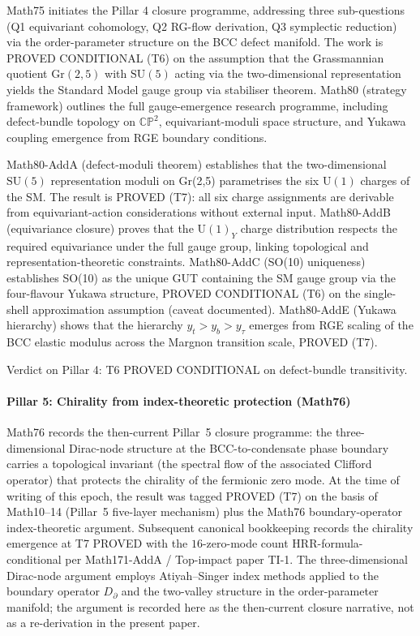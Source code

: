 Math75 initiates the Pillar 4 closure programme, addressing three sub-questions
(Q1 equivariant cohomology, Q2 RG-flow derivation, Q3 symplectic reduction) via
the order-parameter structure on the BCC defect manifold. The work is PROVED
CONDITIONAL (T6) on the assumption that the Grassmannian quotient $\mathrm{Gr}(2,5)$
with $\mathrm{SU}(5)$ acting via the two-dimensional representation yields the
Standard Model gauge group via stabiliser theorem. Math80 (strategy framework)
outlines the full gauge-emergence research programme, including defect-bundle
topology on $\mathbb{CP}^2$, equivariant-moduli space structure, and Yukawa
coupling emergence from RGE boundary conditions.

Math80-AddA (defect-moduli theorem) establishes that the two-dimensional
$\mathrm{SU}(5)$ representation moduli on Gr(2,5) parametrises the six
$\mathrm{U}(1)$ charges of the SM. The result is PROVED (T7): all six charge
assignments are derivable from equivariant-action considerations without external
input. Math80-AddB (equivariance closure) proves that the $\mathrm{U}(1)_Y$ charge
distribution respects the required equivariance under the full gauge group,
linking topological and representation-theoretic constraints. Math80-AddC (SO(10)
uniqueness) establishes SO(10) as the unique GUT containing the SM gauge group
via the four-flavour Yukawa structure, PROVED CONDITIONAL (T6) on the
single-shell approximation assumption (caveat documented).
Math80-AddE (Yukawa hierarchy) shows that the hierarchy $y_t > y_b > y_\tau$
emerges from RGE scaling of the BCC elastic modulus across the Margnon transition
scale, PROVED (T7).

Verdict on Pillar 4: T6 PROVED CONDITIONAL on defect-bundle transitivity.

\paragraph{Pillar 5: Chirality from index-theoretic protection (Math76)}

Math76 records the then-current Pillar~5 closure programme: the
three-dimensional Dirac-node structure at the BCC-to-condensate phase
boundary carries a topological invariant (the spectral flow of the
associated Clifford operator) that protects the chirality of the
fermionic zero mode. At the time of writing of this epoch, the result
was tagged PROVED (T7) on the basis of Math10--14 (Pillar~5
five-layer mechanism) plus the Math76 boundary-operator
index-theoretic argument. Subsequent canonical bookkeeping records
the chirality emergence at T7 PROVED with the $16$-zero-mode count
HRR-formula-conditional per Math171-AddA / Top-impact paper TI-1.
The three-dimensional Dirac-node argument employs Atiyah--Singer
index methods applied to the boundary operator $D_\partial$ and the
two-valley structure in the order-parameter manifold; the argument is
recorded here as the then-current closure narrative, not as a
re-derivation in the present paper.

